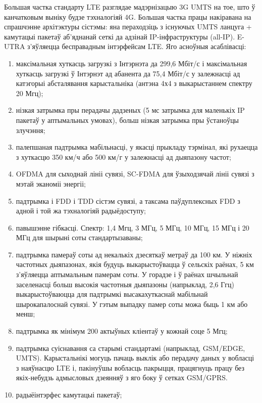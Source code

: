 Большая частка стандарту LTE разглядае мадэрнізацыю 3G UMTS на тое, што ў канчатковым выніку будзе тэхналогіяй 4G. Большая частка працы накіравана на спрашчэнне архітэктуры сістэмы: яна пераходзіць з існуючых UMTS ланцуга + камутацыі пакетаў аб'яднанай сеткі да адзінай IP-інфраструктуры (all-IP). E-UTRA з'яўляецца бесправадным інтэрфейсам LTE. Яго асноўныя асаблівасці:
\begin{enumerate}
    \item максімальная хуткасць загрузкі з Інтэрнэта да 299,6 Мбіт/с і максімальная хуткасць загрузкі ў Інтэрнэт ад абанента да 75,4 Мбіт/с у залежнасці ад катэгорыі абсталявання карыстальніка (антэна 4х4 з выкарыстаннем спектру 20 Мгц);
    \item нізкая затрымка пры перадачы дадзеных (5 мс затрымка для маленькіх IP пакетаў у аптымальных умовах), больш нізкая затрымка пры ўстаноўцы злучэння;
    \item палепшаная падтрымка мабільнасці, у якасці прыкладу тэрмінал, які рухаецца з хуткасцю 350 км/ч або 500 км/г у залежнасці ад дыяпазону частот;
    \item OFDMA для сыходнай лініі сувязі, SC-FDMA для ўзыходзячай лініі сувязі з мэтай эканоміі энергіі;
    \item падтрымка і FDD і TDD сістэм сувязі, а таксама паўдуплексных FDD з адной і той жа тэхналогіяй радыёдоступу;
    \item павышэнне гібкасці. Спектр: 1,4 Мгц, 3 МГц, 5 МГц, 10 МГц, 15 МГц і 20 МГц для шырыні соты стандартызаваны;
    \item падтрымка памераў соты ад некалькіх дзесяткаў метраў да 100 км. У ніжніх частотных дыяпазонах, якія будуць выкарыстоўвацца ў сельскіх раёнах, 5 км з'яўляецца аптымальным памерам соты. У горадзе і ў раёнах шчыльнай заселенасці больш высокія частотныя дыяпазоны (напрыклад, 2,6 Ггц) выкарыстоўваюцца для падтрымкі высакахуткаснай мабільнай шырокапалоснай сувязі. У гэтым выпадку памер соты можа быць 1 км або менш;
    \item падтрымка як мінімум 200 актыўных кліентаў у кожнай соце 5 Мгц;
    \item падтрымка суіснавання са старымі стандартамі (напрыклад, GSM/EDGE, UMTS). Карыстальнікі могуць пачаць выклік або перадачу даных у вобласці з наяўнасцю LTE і, пакінуўшы вобласць пакрыцця, працягнуць працу без якіх-небудзь адмысловых дзеянняў з яго боку ў сетках GSM/GPRS.
    \item радыёінтэрфес камутацыі пакетаў;
\end{enumerate}

